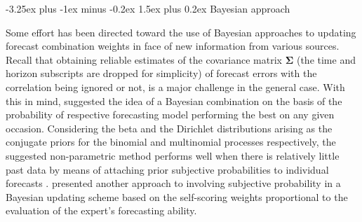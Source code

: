 \documentclass[11pt]{article}
\makeatletter
\renewcommand{\paragraph}{\@startsection{paragraph}{4}{0ex}%
   {-3.25ex plus -1ex minus -0.2ex}%
   {1.5ex plus 0.2ex}%
   {\normalfont\normalsize\bfseries}}
\makeatother
\begin{document}

\paragraph{Bayesian approach}

Some effort has been directed toward the use of Bayesian approaches to updating forecast combination weights in face of new information from various sources. Recall that obtaining reliable estimates of the covariance matrix $\boldsymbol{\Sigma}$ (the time and horizon subscripts are dropped for simplicity) of forecast errors with the correlation being ignored or not, is a major challenge in the general case. With this in mind, \cite{Bunn1975-vz} suggested the idea of a Bayesian combination on the basis of the probability of respective forecasting model performing the best on any given occasion. Considering the beta and the Dirichlet distributions arising as the conjugate priors for the binomial and multinomial processes respectively, the suggested non-parametric method performs well when there is relatively little past data by means of attaching prior subjective probabilities to individual forecasts \citep{Bunn1985-vo,De_Menezes2000-vd}. \cite{Oller1978-wx} presented another approach to involving subjective probability in a Bayesian updating scheme based on the self-scoring weights proportional to the evaluation of the expert's forecasting ability.
\end{document}
